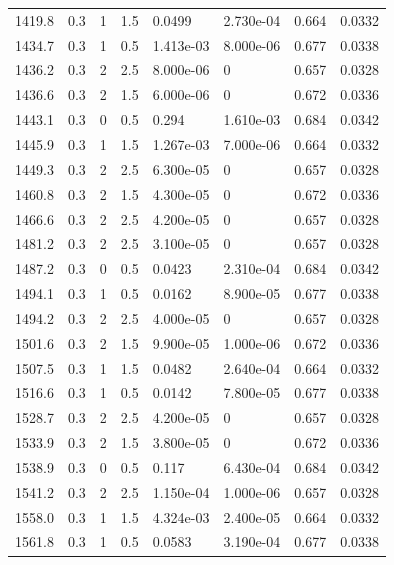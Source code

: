 \documentclass[preview]{standalone}
\begin{document}
{{{{{\begin{tabular}{L{1.2cm}C{1.2cm} C{0.3cm}C{0.5cm} C{1.4cm}C{1.4cm} C{1.4cm}C{1.4cm}}
  1419.8  &   0.3  & 1     & 1.5 &  0.0499  & 2.730e-04  & 0.664 &  0.0332   \\ 
  1434.7  &   0.3  & 1     & 0.5 &  1.413e-03  & 8.000e-06  & 0.677 &  0.0338   \\ 
  1436.2  &   0.3  & 2     & 2.5 &  8.000e-06  & 0  & 0.657 &  0.0328   \\ 
  1436.6  &   0.3  & 2     & 1.5 &  6.000e-06  & 0  & 0.672 &  0.0336   \\ 
  1443.1  &   0.3  & 0     & 0.5 &  0.294  & 1.610e-03  & 0.684 &  0.0342   \\ 
  1445.9  &   0.3  & 1     & 1.5 &  1.267e-03  & 7.000e-06  & 0.664 &  0.0332   \\ 
  1449.3  &   0.3  & 2     & 2.5 &  6.300e-05  & 0  & 0.657 &  0.0328   \\ 
  1460.8  &   0.3  & 2     & 1.5 &  4.300e-05  & 0  & 0.672 &  0.0336   \\ 
  1466.6  &   0.3  & 2     & 2.5 &  4.200e-05  & 0  & 0.657 &  0.0328   \\ 
  1481.2  &   0.3  & 2     & 2.5 &  3.100e-05  & 0  & 0.657 &  0.0328   \\ 
  1487.2  &   0.3  & 0     & 0.5 &  0.0423  & 2.310e-04  & 0.684 &  0.0342   \\ 
  1494.1  &   0.3  & 1     & 0.5 &  0.0162  & 8.900e-05  & 0.677 &  0.0338   \\ 
  1494.2  &   0.3  & 2     & 2.5 &  4.000e-05  & 0  & 0.657 &  0.0328   \\ 
  1501.6  &   0.3  & 2     & 1.5 &  9.900e-05  & 1.000e-06  & 0.672 &  0.0336   \\ 
  1507.5  &   0.3  & 1     & 1.5 &  0.0482  & 2.640e-04  & 0.664 &  0.0332   \\ 
  1516.6  &   0.3  & 1     & 0.5 &  0.0142  & 7.800e-05  & 0.677 &  0.0338   \\ 
  1528.7  &   0.3  & 2     & 2.5 &  4.200e-05  & 0  & 0.657 &  0.0328   \\ 
  1533.9  &   0.3  & 2     & 1.5 &  3.800e-05  & 0  & 0.672 &  0.0336   \\ 
  1538.9  &   0.3  & 0     & 0.5 &  0.117  & 6.430e-04  & 0.684 &  0.0342   \\ 
  1541.2  &   0.3  & 2     & 2.5 &  1.150e-04  & 1.000e-06  & 0.657 &  0.0328   \\ 
  1558.0  &   0.3  & 1     & 1.5 &  4.324e-03  & 2.400e-05  & 0.664 &  0.0332   \\ 
  1561.8  &   0.3  & 1     & 0.5 &  0.0583  & 3.190e-04  & 0.677 &  0.0338   \\ 

\end{tabular}}}}}}
\end{document}
